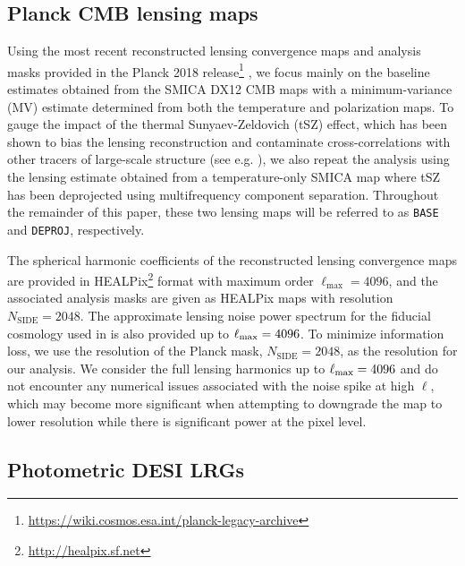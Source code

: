 \documentclass[a4paper,usenatbib]{mnras}
\begin{document}
\subsection{Planck CMB lensing maps}

Using the most recent reconstructed lensing convergence maps and analysis masks provided in the Planck 2018 release\footnote{\url{https://wiki.cosmos.esa.int/planck-legacy-archive}} \citep{PlanckVIII}, we focus mainly on the baseline estimates obtained from the SMICA DX12 CMB maps with a minimum-variance (MV) estimate determined from both the temperature and polarization maps. To gauge the impact of the thermal Sunyaev-Zeldovich (tSZ) effect, which has been shown to bias the lensing reconstruction and contaminate cross-correlations with other tracers of large-scale structure (see e.g. \citealt{Osborne++14, vanEngelen++14, Madhavacheril++18, Schaan++19}), we also repeat the analysis using the lensing estimate obtained from a temperature-only SMICA map where tSZ has been deprojected using multifrequency component separation. Throughout the remainder of this paper, these two lensing maps will be referred to as \texttt{BASE} and \texttt{DEPROJ}, respectively. 

The spherical harmonic coefficients of the reconstructed lensing convergence maps are provided in HEALPix\footnote{\url{http://healpix.sf.net}} \citep{Gorski++05} format with maximum order $\ell_{\text{max}}=4096$, and the associated analysis masks are given as HEALPix maps with resolution $N_{\text{SIDE}} = 2048$. The approximate lensing noise power spectrum for the fiducial cosmology used in \cite{PlanckVIII} is also provided up to $\ell_{\rm max} = 4096$. To minimize information loss, we use the resolution of the Planck mask, $N_{\text{SIDE}}=2048$, as the resolution for our analysis. We consider the full lensing harmonics up to $\ell_{\rm max} = 4096$ and do not encounter any numerical issues associated with the noise spike at high $\ell$, which may become more significant when attempting to downgrade the map to lower resolution while there is significant power at the pixel level.

\subsection{Photometric DESI LRGs}
\end{document}
